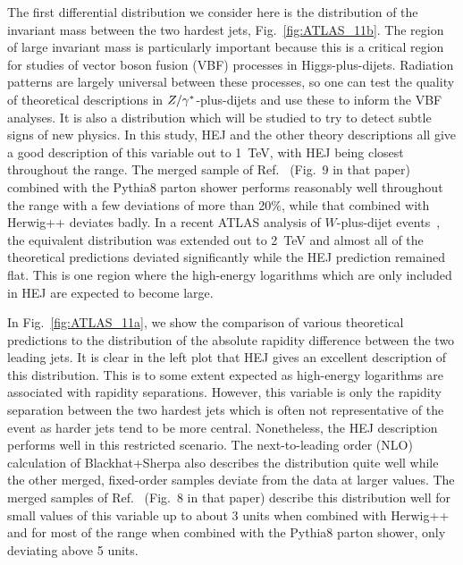 			The first differential distribution we consider here is the distribution of the
			invariant mass between the two hardest jets, Fig.~\eqref{fig:ATLAS_11b}.  The
			region of large invariant mass is particularly important because this is a
			critical region for studies of vector boson fusion (VBF) processes in
			Higgs-plus-dijets.  Radiation patterns are largely universal between these
			processes, so one can test the quality of theoretical descriptions in
			$Z/\gamma^*$-plus-dijets and use these to inform the VBF analyses.  It is also a
			distribution which will be studied to try to detect subtle signs of new physics.
			In this study, HEJ and the other theory descriptions all give a good description
			of this variable out to 1~TeV, with HEJ being closest throughout the range.  The
			merged sample of Ref.~\cite{Frederix:2015eii} (Fig.~9 in that paper) combined
			with the Pythia8 parton shower performs reasonably well throughout the range
			with a few deviations of more than 20\%, while that combined with Herwig++
			deviates badly.  In a recent ATLAS analysis of $W$-plus-dijet
			events~\cite{Aad:2014qxa}, the equivalent distribution was extended out to 2~TeV
			and almost all of the theoretical predictions deviated significantly while the
			HEJ prediction remained flat.  This is one region where the high-energy
			logarithms which are only included in HEJ are expected to become large.

			In Fig.~\eqref{fig:ATLAS_11a}, we show the comparison of various theoretical
			predictions to the distribution of the absolute rapidity difference between the
			two leading jets.  It is clear in the left plot that HEJ gives an excellent
			description of this distribution.  This is to some extent expected as
			high-energy logarithms are associated with rapidity separations.  However, this
			variable is only the rapidity separation between the two hardest jets which is
			often not representative of the event as harder jets tend to be more central.
			Nonetheless, the HEJ description performs well in this restricted scenario.  The
			next-to-leading order (NLO) calculation of Blackhat+Sherpa also describes the
			distribution quite well while the other merged, fixed-order samples deviate from
			the data at larger values.  The merged samples of Ref.~\cite{Frederix:2015eii}
			(Fig.~8 in that paper) describe this distribution well for small values of this
			variable up to about 3 units when combined with Herwig++ and for most of the
			range when combined with the Pythia8 parton shower, only deviating above 5 units.

